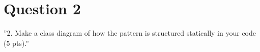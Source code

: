 \section{Question 2}

''2. Make a class diagram of how the pattern is structured statically in your code (5 pts).''
